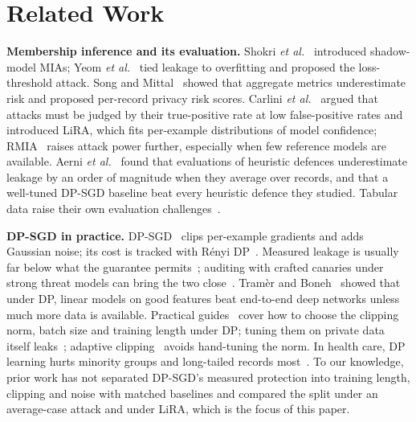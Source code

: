 \documentclass[conference]{IEEEtran}
\begin{document}
\section{Related Work}
\textbf{Membership inference and its evaluation.} Shokri \emph{et al.}~\cite{shokri2017} introduced shadow-model MIAs; Yeom \emph{et al.}~\cite{yeom2018} tied leakage to overfitting and proposed the loss-threshold attack. Song and Mittal~\cite{song2021} showed that aggregate metrics underestimate risk and proposed per-record privacy risk scores. Carlini \emph{et al.}~\cite{carlini2022} argued that attacks must be judged by their true-positive rate at low false-positive rates and introduced LiRA, which fits per-example distributions of model confidence; RMIA~\cite{zarifzadeh2024} raises attack power further, especially when few reference models are available. Aerni \emph{et al.}~\cite{aerni2024} found that evaluations of heuristic defences underestimate leakage by an order of magnitude when they average over records, and that a well-tuned DP-SGD baseline beat every heuristic defence they studied. Tabular data raise their own evaluation challenges~\cite{pera2026}.

\textbf{DP-SGD in practice.} DP-SGD~\cite{abadi2016} clips per-example gradients and adds Gaussian noise; its cost is tracked with R\'enyi DP~\cite{mironov2017,mironov2019}. Measured leakage is usually far below what the guarantee permits~\cite{jayaraman2019}; auditing with crafted canaries under strong threat models can bring the two close~\cite{jagielski2020,nasr2023}. Tram\`er and Boneh~\cite{tramer2021} showed that under DP, linear models on good features beat end-to-end deep networks unless much more data is available. Practical guides~\cite{ponomareva2023} cover how to choose the clipping norm, batch size and training length under DP; tuning them on private data itself leaks~\cite{papernot2022}; adaptive clipping~\cite{andrew2021} avoids hand-tuning the norm. In health care, DP learning hurts minority groups and long-tailed records most~\cite{suriyakumar2021}. To our knowledge, prior work has not separated DP-SGD's measured protection into training length, clipping and noise with matched baselines and compared the split under an average-case attack and under LiRA, which is the focus of this paper.
\end{document}
